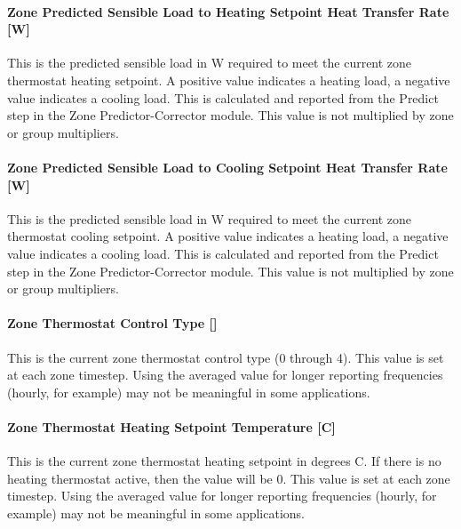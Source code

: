 \paragraph{Zone Predicted Sensible Load to Heating Setpoint Heat Transfer Rate {[}W{]}}\label{zone-predicted-sensible-load-to-heating-setpoint-heat-transfer-rate-w}

This is the predicted sensible load in W required to meet the current zone thermostat heating setpoint. A positive value indicates a heating load, a negative value indicates a cooling load. This is calculated and reported from the Predict step in the Zone Predictor-Corrector module. This value is not multiplied by zone or group multipliers.

\paragraph{Zone Predicted Sensible Load to Cooling Setpoint Heat Transfer Rate {[}W{]}}\label{zone-predicted-sensible-load-to-cooling-setpoint-heat-transfer-rate-w}

This is the predicted sensible load in W required to meet the current zone thermostat cooling setpoint. A positive value indicates a heating load, a negative value indicates a cooling load. This is calculated and reported from the Predict step in the Zone Predictor-Corrector module. This value is not multiplied by zone or group multipliers.

\paragraph{Zone Thermostat Control Type {[]}}\label{zone-thermostat-control-type}

This is the current zone thermostat control type (0 through 4). This value is set at each zone timestep. Using the averaged value for longer reporting frequencies (hourly, for example) may not be meaningful in some applications.

\paragraph{Zone Thermostat Heating Setpoint Temperature {[}C{]}}\label{zone-thermostat-heating-setpoint-temperature-c}

This is the current zone thermostat heating setpoint in degrees C. If there is no heating thermostat active, then the value will be 0. This value is set at each zone timestep. Using the averaged value for longer reporting frequencies (hourly, for example) may not be meaningful in some applications.


